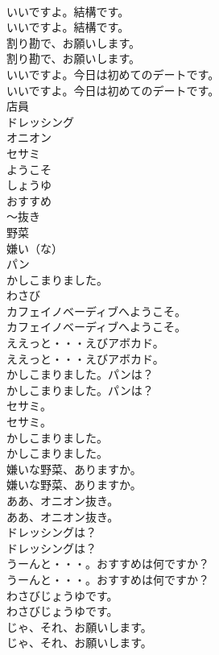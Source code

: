 \documentclass[8pt]{extreport}
\begin{document}
\begin{CJK}{UTF8}{min}
\\	いいですよ。結構です。	
\\	いいですよ。結構です。 
\\	割り勘で、お願いします。	
\\	割り勘で、お願いします。 
\\	いいですよ。今日は初めてのデートです。	
\\	いいですよ。今日は初めてのデートです。 
\\	店員
\\	ドレッシング
\\	オニオン
\\	セサミ
\\	ようこそ
\\	しょうゆ
\\	おすすめ
\\	～抜き
\\	野菜
\\	嫌い（な）
\\	パン
\\	かしこまりました。
\\	わさび
\\	カフェイノベーディブへようこそ。	
\\	カフェイノベーディブへようこそ。 
\\	ええっと・・・えびアボカド。	
\\	ええっと・・・えびアボカド。 
\\	かしこまりました。パンは？	
\\	かしこまりました。パンは？ 
\\	セサミ。	
\\	セサミ。 
\\	かしこまりました。	
\\	かしこまりました。 
\\	嫌いな野菜、ありますか。	
\\	嫌いな野菜、ありますか。 
\\	ああ、オニオン抜き。	
\\	ああ、オニオン抜き。 
\\	ドレッシングは？	
\\	ドレッシングは？ 
\\	うーんと・・・。おすすめは何ですか？	
\\	うーんと・・・。おすすめは何ですか？ 
\\	わさびじょうゆです。	
\\	わさびじょうゆです。 
\\	じゃ、それ、お願いします。	
\\	じゃ、それ、お願いします。 

\end{CJK}
\end{document}
